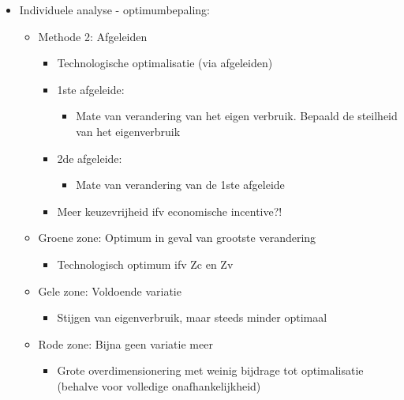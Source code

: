\documentclass[12pt]{article}
\begin{document}
\begin{itemize}
    \item Individuele analyse - optimumbepaling:\begin{itemize}
        \item Methode 2: Afgeleiden\begin{itemize}
            \item Technologische optimalisatie (via afgeleiden)
                \item 1ste afgeleide:\begin{itemize}
                \item Mate van verandering van het eigen verbruik. Bepaald de steilheid van het
                eigenverbruik
                \end{itemize}
                \item 2de afgeleide:\begin{itemize}
                    \item Mate van verandering van de 1ste
                    afgeleide
                \end{itemize}
            \item Meer keuzevrijheid ifv economische incentive?!
        \end{itemize}
        \item Groene zone: Optimum in geval van grootste verandering\begin{itemize}
            \item Technologisch optimum ifv Zc en Zv
        \end{itemize}
        \item Gele zone: Voldoende variatie\begin{itemize}
            \item Stijgen van eigenverbruik, maar steeds minder optimaal
        \end{itemize}
        \item Rode zone: Bijna geen variatie meer\begin{itemize}
            \item Grote overdimensionering met weinig bijdrage tot
            optimalisatie (behalve voor volledige onafhankelijkheid)
        \end{itemize}
    \end{itemize}
\end{itemize}
\end{document}
